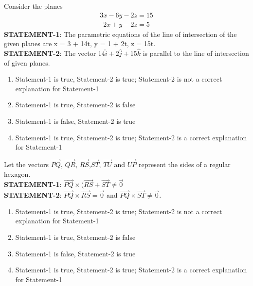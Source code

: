 \item Consider the planes 
\begin{align*}
3x - 6y - 2z = 15
\end{align*}
\begin{align*} 
2x + y - 2z = 5
\end{align*}
\textbf{STATEMENT-1}: The parametric equations of the line of intersection of the given planes are x = 3 + 14t, y = 1 + 2t, z = 15t.\\
\textbf{STATEMENT-2}: The vector $14\hat{i} + 2\hat{j} + 15\hat{k}$ is parallel to the line of intersection of given planes.
\begin{enumerate}
\item Statement-1 is true, Statement-2 is true; Statement-2 is not a correct explanation for Statement-1
\item Statement-1 is true, Statement-2 is false
\item Statement-1 is false, Statement-2 is true
\item Statement-1 is true, Statement-2 is true; Statement-2 is a correct explanation for Statement-1
\end{enumerate}

\item Let the vectors $\overrightarrow{PQ}$, $\overrightarrow{QR}$, $\overrightarrow{RS}$,$\overrightarrow{ST}$, $\overrightarrow{TU}$ and $\overrightarrow{UP}$ represent the sides of a regular hexagon.\\
\textbf{STATEMENT-1}: $\overrightarrow{PQ} \times (\overrightarrow{RS} + \overrightarrow{ST} \neq \overrightarrow{0}$\\
\textbf{STATEMENT-2}: $\overrightarrow{PQ} \times \overrightarrow{RS} = \overrightarrow{0}$ and $\overrightarrow{PQ} \times \overrightarrow{ST} \neq \overrightarrow{0}$.
\begin{enumerate}
\item Statement-1 is true, Statement-2 is true; Statement-2 is not a correct explanation for Statement-1
\item Statement-1 is true, Statement-2 is false
\item Statement-1 is false, Statement-2 is true
\item Statement-1 is true, Statement-2 is true; Statement-2 is a correct explanation for Statement-1
\end{enumerate}

